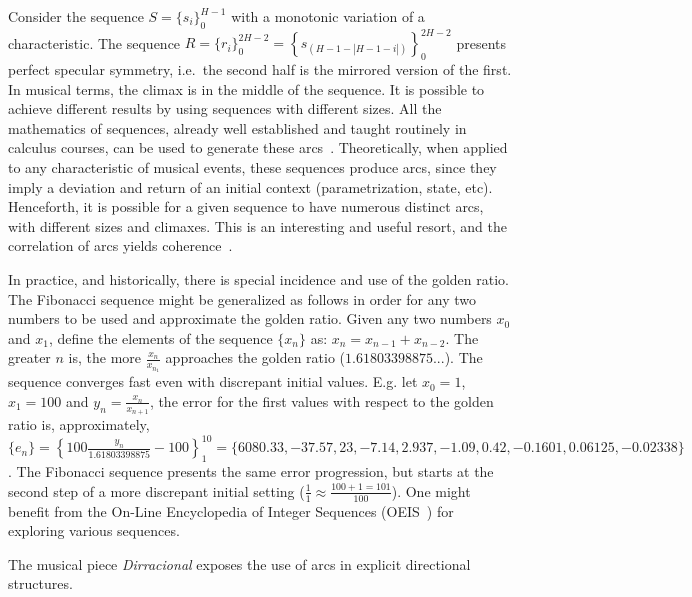 \documentclass[format=acmsmall, review=false, screen=true]{acmart}
\begin{document}
Consider the sequence $S=\{s_i\}_0^{H-1}$ with a monotonic variation of a characteristic.
The sequence
$R=\{r_i\}_0^{2H -2}=\left\{s_{(H-1-|H-1-i|)}\right\}_0^{2H-2}$
presents perfect specular symmetry, i.e.\ the second half is the
mirrored version of the first. In musical terms, the climax is
in the middle of the sequence. It is possible to achieve different results
by using sequences with different sizes. All the mathematics of
sequences, already well established and taught routinely in calculus courses, can be used to generate these arcs~\cite{Guidorizzo,Schoenberg}.
Theoretically, when applied to any characteristic of musical events,
these sequences produce arcs, since they imply a deviation and return of an initial context (parametrization, state, etc).
Henceforth, it is possible for a given sequence to have
numerous distinct arcs, with different sizes and climaxes. 
This is an interesting and useful resort, and the correlation of arcs yields coherence~\cite{Salzer}.

In practice, and historically, there is special incidence and use of the golden ratio.
The Fibonacci sequence might be generalized as follows in order for any two numbers to be used
and approximate the golden ratio.
Given any two numbers $x_0$
and $x_1$, define the elements of the sequence $\{x_n\}$ as: $x_n=x_{n-1}+x_{n-2}$.
The greater $n$ is, the more $\frac{x_{n}}{x_{n_1}}$ approaches the golden ratio
($1.61803398875...$). The sequence converges fast even with discrepant
initial values.
E.g. let $x_0=1$, $x_1=100$ and $y_n=\frac{x_n}{x_{n+1}}$, the error for the first values with
respect to the golden ratio is, approximately, $\{ e_n \}
=\left\{100\frac{y_n}{1.61803398875}-100 \right\}_1^{10}=\{6080.33, -37.57, 23,
-7.14, 2.937, -1.09, 0.42, -0.1601, 0.06125, -0.02338\}$. The Fibonacci sequence
presents the same error progression, but starts at the second step of a more discrepant initial setting
($\frac{1}{1}\approx\frac{100+1 = 101}{100}$).
One might benefit from the On-Line Encyclopedia of Integer Sequences (OEIS~\cite{oeis})
for exploring various sequences.

The musical piece \emph{Dirracional} exposes the use of arcs in explicit directional structures.~\cite{MASSA}
\end{document}
